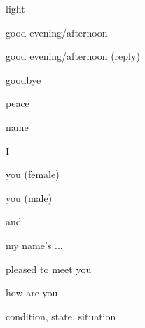 \begin{flashcard}{\LARGE light}
\LARGE {}
\end{flashcard}
\begin{flashcard}{\LARGE good evening/afternoon}
\LARGE {}
\end{flashcard}
\begin{flashcard}{\LARGE good evening/afternoon (reply)}
\LARGE {}
\end{flashcard}
\begin{flashcard}{\LARGE goodbye}
\LARGE {}
\end{flashcard}
\begin{flashcard}{\LARGE peace}
\LARGE {}
\end{flashcard}
\begin{flashcard}{\LARGE name}
\LARGE {}
\end{flashcard}
\begin{flashcard}{\LARGE I}
\LARGE {}
\end{flashcard}
\begin{flashcard}{\LARGE you (female)}
\LARGE {}
\end{flashcard}
\begin{flashcard}{\LARGE you (male)}
\LARGE {}
\end{flashcard}
\begin{flashcard}{\LARGE and}
\LARGE {}
\end{flashcard}
\begin{flashcard}{\LARGE my name's ...}
\LARGE {}
\end{flashcard}
\begin{flashcard}{\LARGE pleased to meet you}
\LARGE {}
\end{flashcard}
\begin{flashcard}{\LARGE how are you}
\LARGE {}
\end{flashcard}
\begin{flashcard}{\LARGE condition, state, situation}
\LARGE {}
\end{flashcard}
